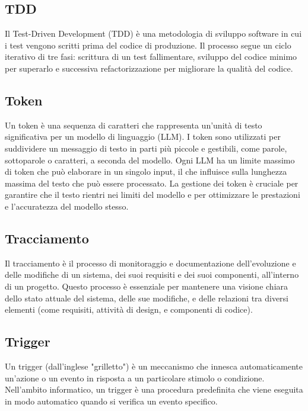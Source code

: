 \hypertarget{sec:tdd}{}
\subsection*{TDD}
Il Test-Driven Development (TDD) è una metodologia di sviluppo software in cui i test vengono scritti prima del codice di produzione. 
Il processo segue un ciclo iterativo di tre fasi: scrittura di un test fallimentare, sviluppo del codice minimo per superarlo e successiva refactorizzazione per migliorare la qualità del codice.

\hypertarget{sec:token}{}
\subsection*{Token}
Un token è una sequenza di caratteri che rappresenta un'unità di testo significativa per un modello di linguaggio (LLM). I token sono
utilizzati per suddividere un messaggio di testo in parti più piccole e gestibili, come parole, sottoparole o caratteri, a seconda del
modello. Ogni LLM ha un limite massimo di token che può elaborare in un singolo input, il che influisce sulla lunghezza massima del
testo che può essere processato. La gestione dei token è cruciale per garantire che il testo rientri nei limiti del modello e per
ottimizzare le prestazioni e l'accuratezza del modello stesso.

\subsection*{Tracciamento}
Il tracciamento è il processo di monitoraggio e documentazione dell'evoluzione e delle modifiche di un sistema, dei suoi requisiti e dei suoi componenti, 
all’interno di un progetto. Questo processo è essenziale per mantenere una visione chiara dello stato attuale del sistema, delle sue modifiche, e delle 
relazioni tra diversi elementi (come requisiti, attività di design, e componenti di codice).

\hypertarget{sec:trigger}{}
\subsection*{Trigger}
Un trigger (dall'inglese "grilletto") è un meccanismo che innesca automaticamente un'azione o un evento in risposta a un particolare 
stimolo o condizione. Nell'ambito informatico, un trigger è una procedura predefinita che viene eseguita in modo automatico quando 
si verifica un evento specifico.

\hypertarget{sec:txtai}{}
